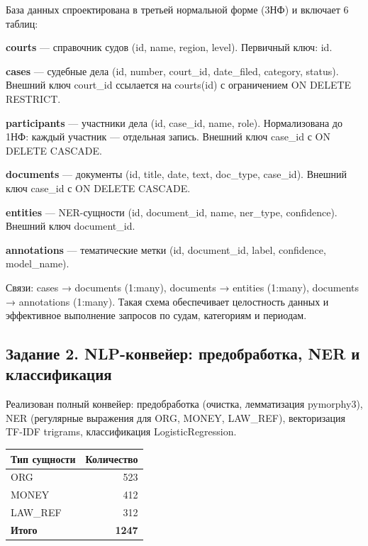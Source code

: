 \documentclass[a4paper,12pt]{article}
\begin{document}
\begin{infobox}
База данных спроектирована в третьей нормальной форме (3НФ) и включает 6 таблиц:

\textbf{courts} — справочник судов (id, name, region, level). Первичный ключ: id.

\textbf{cases} — судебные дела (id, number, court\_id, date\_filed, category, status). Внешний ключ court\_id ссылается на courts(id) с ограничением ON DELETE RESTRICT.

\textbf{participants} — участники дела (id, case\_id, name, role). Нормализована до 1НФ: каждый участник — отдельная запись. Внешний ключ case\_id с ON DELETE CASCADE.

\textbf{documents} — документы (id, title, date, text, doc\_type, case\_id). Внешний ключ case\_id с ON DELETE CASCADE.

\textbf{entities} — NER-сущности (id, document\_id, name, ner\_type, confidence). Внешний ключ document\_id.

\textbf{annotations} — тематические метки (id, document\_id, label, confidence, model\_name).

Связи: cases → documents (1:many), documents → entities (1:many), documents → annotations (1:many). Такая схема обеспечивает целостность данных и эффективное выполнение запросов по судам, категориям и периодам.
\end{infobox}

\subsection{Задание 2. NLP-конвейер: предобработка, NER и классификация}

Реализован полный конвейер: предобработка (очистка, лемматизация pymorphy3), NER (регулярные выражения для ORG, MONEY, LAW\_REF), векторизация TF-IDF trigrams, классификация LogisticRegression.

\begin{infobox}
\begin{tabular}{|l|r|}
\hline
\textbf{Тип сущности} & \textbf{Количество} \\ \hline
ORG & 523 \\ \hline
MONEY & 412 \\ \hline
LAW\_REF & 312 \\ \hline
\textbf{Итого} & \textbf{1247} \\ \hline
\end{tabular}
\end{infobox}
\end{document}
